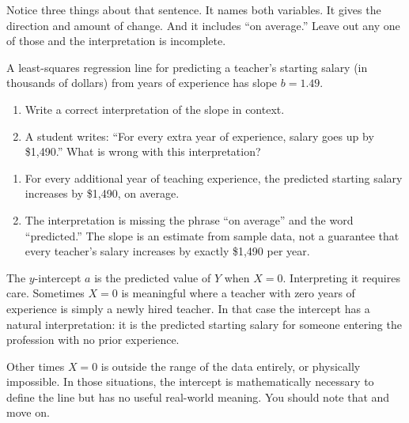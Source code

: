Notice three things about that sentence. It names both variables. It gives the
direction and amount of change. And it includes ``on average.'' Leave out any one
of those and the interpretation is incomplete.

\begin{Exercise}[title={Interpreting the Slope}, label={ex:lr_slope}]
A least-squares regression line for predicting a teacher's starting salary (in
thousands of dollars) from years of experience has slope $b = 1.49$.
\begin{enumerate}
    \item Write a correct interpretation of the slope in context.
    \item A student writes: ``For every extra year of experience, salary goes up
    by \$1{,}490.'' What is wrong with this interpretation?
\end{enumerate}
\end{Exercise}
\begin{Answer}[ref={ex:lr_slope}]
\begin{enumerate}
    \item For every additional year of teaching experience, the predicted starting
    salary increases by \$1{,}490, on average.
    \item The interpretation is missing the phrase ``on average'' and the word
    ``predicted.'' The slope is an estimate from sample data, not a guarantee
    that every teacher's salary increases by exactly \$1{,}490 per year.
\end{enumerate}
\end{Answer}

The $y$-intercept $a$ is the predicted value of $Y$ when $X = 0$. Interpreting
it requires care. Sometimes $X = 0$ is meaningful where a teacher with zero years
of experience is simply a newly hired teacher. In that case the intercept has a
natural interpretation: it is the predicted starting salary for someone entering
the profession with no prior experience.

Other times $X = 0$ is outside the range of the data entirely, or physically
impossible. In those situations, the intercept is mathematically necessary to
define the line but has no useful real-world meaning. You should note that and
move on.

